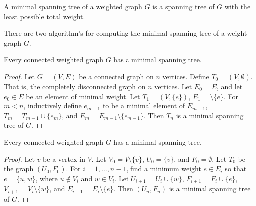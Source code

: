 \documentclass[crop=false,class=book,oneside]{standalone}
\begin{document}
            \begin{definition}
                A minimal spanning tree of a weighted graph $G$
                is a spanning tree of $G$ with the least possible
                total weight.
            \end{definition}
            There are two algorithm's for computing the minimal
            spanning tree of a weight graph $G$.
            \begin{theorem}
                Every connected weighted graph $G$
                has a minimal spanning tree.
            \end{theorem}
            \begin{proof}
                Let $G=(V,E)$ be a connected graph on $n$ vertices.
                Define $T_{0}=(V,\emptyset)$. That is, the completely
                disconnected graph on $n$ vertices. Let $E_{0}=E$,
                and let $e_{0}\in{E}$ be an element of minimal weight.
                Let $T_{1}=(V,\{e\})$, $E_{1}=\setminus\{e\}$.
                For $m<n$, inductively define $e_{m-1}$ to be a minimal
                element of $E_{m-1}$, $T_{m}=T_{m-1}\cup\{e_{m}\}$,
                and $E_{m}=E_{m-1}\setminus\{e_{m-1}\}$.
                Then $T_{n}$ is a minimal spanning tree of $G$.
            \end{proof}
            \begin{theorem}
                Every connected weighted graph $G$ has a minimal
                spanning tree.
            \end{theorem}
            \begin{proof}
                Let $v$ be a vertex in $V$.
                Let $V_{0}=V\setminus\{v\}$,
                $U_{0}=\{v\}$, and $F_{0}=\emptyset$.
                Let $T_{0}$ be the graph $(U_{0},F_{0})$.
                For $i=1,\hdots,n-1$, find a minimum weight
                $e\in{E_{i}}$ so that $e=\{u,w\}$, where
                $u\notin{V_{i}}$ and $w\in{V_{i}}$.
                Let $U_{i+1}=U_{i}\cup\{w\}$,
                $F_{i+1}=F_{i}\cup\{e\}$,
                $V_{i+1}=V_{i}\setminus\{w\}$, and
                $E_{i+1}=E_{i}\setminus\{e\}$.
                Then $(U_{n},F_{n})$ is a minimal spanning tree of
                $G$.
            \end{proof}
\end{document}
